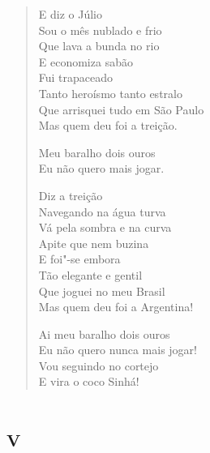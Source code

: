\begin{verse}
E diz o Júlio\\
Sou o mês nublado e frio\\
Que lava a bunda no rio\\
E economiza sabão\\
Fui trapaceado\\
Tanto heroísmo tanto estralo\\
Que arrisquei tudo em São Paulo\\
Mas quem deu foi a treição.

\qquad\qquad\quad Meu baralho dois ouros\\
\qquad\qquad\quad Eu não quero mais jogar.

Diz a treição\\
Navegando na água turva\\
Vá pela sombra e na curva\\
Apite que nem buzina\\
E foi"-se embora\\
Tão elegante e gentil\\
Que joguei no meu Brasil\\
Mas quem deu foi a Argentina!

\qquad\qquad\quad Ai meu baralho dois ouros\\
\qquad\quad Eu não quero nunca mais jogar!\\
\quad Vou seguindo no cortejo\\
E vira o coco Sinhá!
\end{verse}

\chapter[«Plaff! chegou o Carro da Miséria»]{\textsc{v}}

